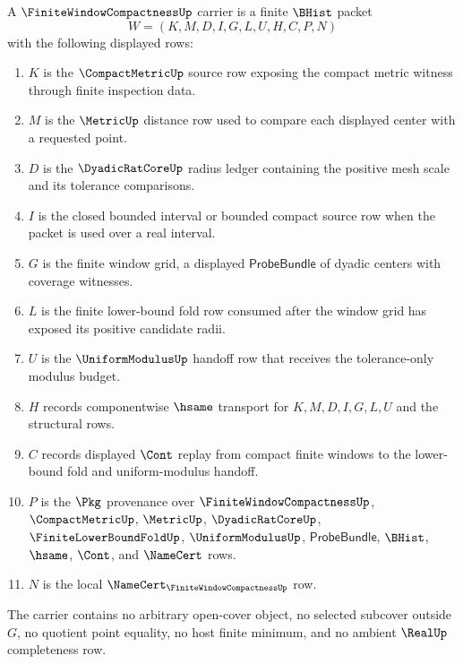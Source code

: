\begin{definition}
\label{def:finite-window-compactness-carrier}
A $\FiniteWindowCompactnessUp$ carrier is a finite $\BHist$ packet
$$
W=(K,M,D,I,G,L,U,H,C,P,N)
$$
with the following displayed rows:
\begin{enumerate}
\item $K$ is the $\CompactMetricUp$ source row exposing the compact metric witness through finite inspection data.
\item $M$ is the $\MetricUp$ distance row used to compare each displayed center with a requested point.
\item $D$ is the $\DyadicRatCoreUp$ radius ledger containing the positive mesh scale and its tolerance comparisons.
\item $I$ is the closed bounded interval or bounded compact source row when the packet is used over a real interval.
\item $G$ is the finite window grid, a displayed $\mathsf{ProbeBundle}$ of dyadic centers with coverage witnesses.
\item $L$ is the finite lower-bound fold row consumed after the window grid has exposed its positive candidate radii.
\item $U$ is the $\UniformModulusUp$ handoff row that receives the tolerance-only modulus budget.
\item $H$ records componentwise $\hsame$ transport for $K,M,D,I,G,L,U$ and the structural rows.
\item $C$ records displayed $\Cont$ replay from compact finite windows to the lower-bound fold and uniform-modulus handoff.
\item $P$ is the $\Pkg$ provenance over $\FiniteWindowCompactnessUp$, $\CompactMetricUp$, $\MetricUp$, $\DyadicRatCoreUp$, $\FiniteLowerBoundFoldUp$, $\UniformModulusUp$, $\mathsf{ProbeBundle}$, $\BHist$, $\hsame$, $\Cont$, and $\NameCert$ rows.
\item $N$ is the local $\NameCert_{\FiniteWindowCompactnessUp}$ row.
\end{enumerate}
The carrier contains no arbitrary open-cover object, no selected subcover outside $G$, no quotient point equality, no host finite minimum, and no ambient $\RealUp$ completeness row.
\end{definition}


